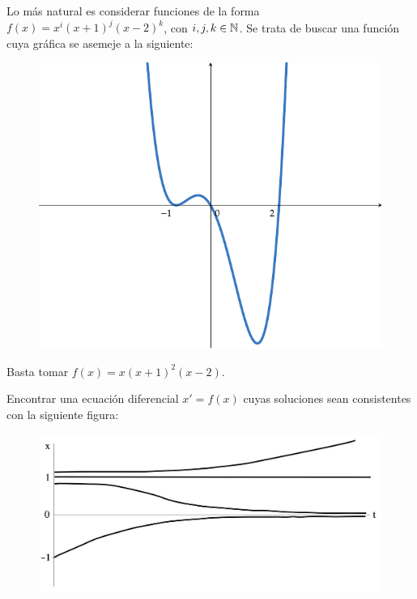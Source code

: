 \documentclass[11pt]{report}
\begin{document}
\begin{solution}
    Lo más natural es considerar funciones de la forma $f(x) = x^{i}(x+1)^{j}(x-2)^k$, con $i,j,k\in\mathbb N$. Se trata de buscar una función cuya gráfica se asemeje a la siguiente:
    \begin{figure}[H]
        \centering
        \includegraphics[scale = 0.7]{plot1/main.pdf}
    \end{figure}
    Basta tomar $f(x) = x(x+1)^2(x-2)$.
\end{solution}

\begin{exercise}
    Encontrar una ecuación diferencial $x'=f(x)$ cuyas soluciones sean consistentes con la siguiente figura:
    \begin{figure}[H]
        \centering
        \includegraphics[scale = 0.2]{img/2.png}
    \end{figure}
\end{exercise}
\end{document}
